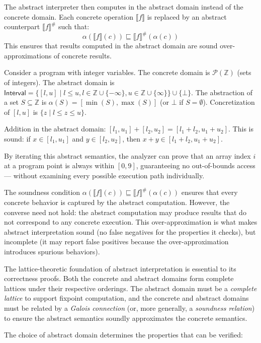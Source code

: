 The abstract interpreter then computes in the abstract domain instead of the concrete domain. Each concrete operation $\llbracket f \rrbracket$ is replaced by an abstract counterpart $\llbracket f \rrbracket^\#$ such that:
\[
\alpha(\llbracket f \rrbracket(c)) \sqsubseteq \llbracket f \rrbracket^\#(\alpha(c))
\]
This ensures that results computed in the abstract domain are sound over-approximations of concrete results.

Consider a program with integer variables. The concrete domain is $\mathcal{P}(\mathbb{Z})$ (sets of integers). The abstract domain is $\mathsf{Interval} = \{ [l, u] \mid l \leq u, l \in \mathbb{Z} \cup \{-\infty\}, u \in \mathbb{Z} \cup \{\infty\} \} \cup \{\bot\}$. The abstraction of a set $S \subseteq \mathbb{Z}$ is $\alpha(S) = [\min(S), \max(S)]$ (or $\bot$ if $S = \emptyset$). Concretization of $[l,u]$ is $\{ z \mid l \leq z \leq u \}$.

Addition in the abstract domain: $[l_1, u_1] + [l_2, u_2] = [l_1 + l_2, u_1 + u_2]$. This is sound: if $x \in [l_1, u_1]$ and $y \in [l_2, u_2]$, then $x + y \in [l_1 + l_2, u_1 + u_2]$.

By iterating this abstract semantics, the analyzer can prove that an array index $i$ at a program point is always within $[0, 9]$, guaranteeing no out-of-bounds access --- without examining every possible execution path individually.

The soundness condition $\alpha(\llbracket f \rrbracket(c)) \sqsubseteq \llbracket f \rrbracket^\#(\alpha(c))$ ensures that every concrete behavior is captured by the abstract computation. However, the converse need not hold: the abstract computation may produce results that do not correspond to any concrete execution. This over-approximation is what makes abstract interpretation sound (no false negatives for the properties it checks), but incomplete (it may report false positives because the over-approximation introduces spurious behaviors).

The lattice-theoretic foundation of abstract interpretation is essential to its correctness proofs. Both the concrete and abstract domains form complete lattices under their respective orderings. The abstract domain must be a \emph{complete lattice} to support fixpoint computation, and the concrete and abstract domains must be related by a \emph{Galois connection} (or, more generally, a \emph{soundness relation}) to ensure the abstract semantics soundly approximates the concrete semantics.

The choice of abstract domain determines the properties that can be verified:

